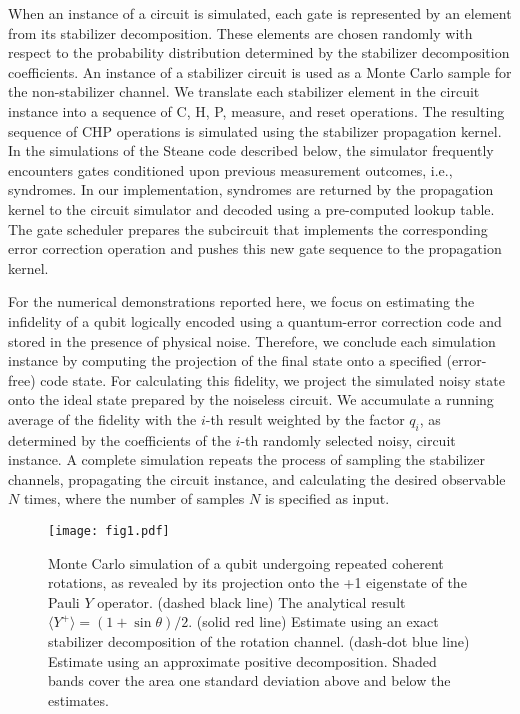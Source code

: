\documentclass[twocolumn,pra]{revtex4}
\begin{document}
When an instance of a circuit is simulated, each gate is represented by an element from its stabilizer decomposition. These elements are chosen randomly with respect to the probability distribution determined by the stabilizer decomposition coefficients. An instance of a stabilizer circuit is used as a Monte Carlo sample for the non-stabilizer channel. We translate each stabilizer element in the circuit instance into a sequence of C, H, P, measure, and reset operations. The resulting sequence of CHP operations is simulated using the stabilizer propagation kernel. In the simulations of the Steane code described below, the simulator frequently encounters gates conditioned upon previous measurement outcomes, i.e., syndromes. In our implementation, syndromes are returned by the propagation kernel to the circuit simulator and decoded using a pre-computed lookup table. The gate scheduler prepares the subcircuit that implements the corresponding error correction operation and pushes this new gate sequence to the propagation kernel.
\par
For the numerical demonstrations reported here, we focus on estimating the infidelity of a qubit logically encoded using a quantum-error correction code and stored in the presence of physical noise. Therefore, we conclude each simulation instance by computing the projection of the final state onto a specified (error-free) code state. For calculating this fidelity, we project the simulated noisy state onto the ideal state prepared by the noiseless circuit. We accumulate a running average of the fidelity with the $i$-th result weighted by the factor $ q_{i}$, as determined by the coefficients of the $i$-th randomly selected noisy, circuit instance. A complete simulation repeats the process of sampling the stabilizer channels, propagating the circuit instance, and calculating the desired observable $N$ times, where the number of samples $N$ is specified as input.
\par
\begin{figure}
\centering
\texttt{[image: fig1.pdf]}
\caption{Monte Carlo simulation of a qubit undergoing repeated coherent rotations, as revealed by its projection onto the +1 eigenstate of the Pauli $Y$ operator.  (dashed black line) The analytical result $\langle Y^{+} \rangle = (1+\sin\theta)/2$. (solid red line) Estimate using an exact stabilizer decomposition of the rotation channel. (dash-dot blue line) Estimate using an approximate positive decomposition. Shaded bands cover the area one standard deviation above and below the estimates.}
\label{fig: qubit rotation}
\end{figure}
\end{document}
